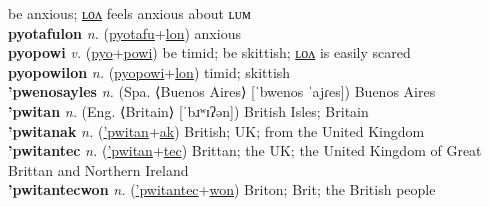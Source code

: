 be anxious; \hyperref[pyotafulon]{ʟᴏᴧ} feels anxious about ʟᴜᴍ \label{pyotafu} \\
\textbf{pyotafulon} \textit{n.} (\hyperref[pyotafu]{pyotafu}+\hyperref[lon]{lon})
anxious \label{pyotafulon} \\
\textbf{pyopowi} \textit{v.} (\hyperref[pyo]{pyo}+\hyperref[powi]{powi})
be timid; be skittish; \hyperref[pyopowilon]{ʟᴏᴧ} is easily scared \label{pyopowi} \\
\textbf{pyopowilon} \textit{n.} (\hyperref[pyopowi]{pyopowi}+\hyperref[lon]{lon})
timid; skittish \label{pyopowilon} \\
\textbf{'pwenosayles} \textit{n.} (Spa. ⟨Buenos Aires⟩ [ˈbwenos ˈajɾes])
Buenos Aires \label{'pwenosayles} \\
\textbf{'pwitan} \textit{n.} (Eng. ⟨Britain⟩ [ˈbɹʷɪʔən])
British Isles; Britain \label{'pwitan} \\
\textbf{'pwitanak} \textit{n.} (\hyperref['pwitan]{'pwitan}+\hyperref[ak]{ak})
British; UK; from the United Kingdom \label{'pwitanak} \\
\textbf{'pwitantec} \textit{n.} (\hyperref['pwitan]{'pwitan}+\hyperref[tec]{tec})
Brittan; the UK; the United Kingdom of Great Brittan and Northern Ireland \label{'pwitantec} \\
\textbf{'pwitantecwon} \textit{n.} (\hyperref['pwitantec]{'pwitantec}+\hyperref[won]{won})
Briton; Brit; the British people \label{'pwitantecwon} \\
